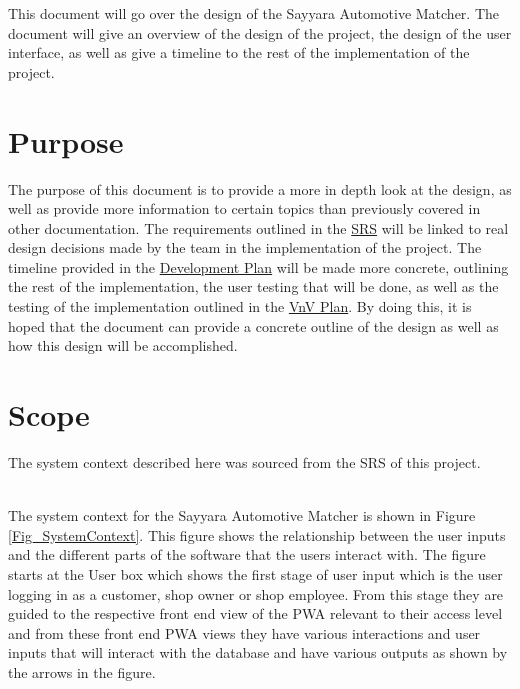 \documentclass[12pt, titlepage]{article}
\begin{document}
This document will go over the design of the Sayyara Automotive Matcher. The document will give an overview of the design of the project, the design of the user interface, as well as give a timeline to the rest of the implementation of the project.

\section{Purpose}

The purpose of this document is to provide a more in depth look at the design, as well as provide more information to certain topics than previously covered in other documentation. The requirements outlined in the \href{https://github.com/HKanwal/kapstone/blob/main/docs/SRS/SRS.pdf}{SRS}
 will be linked to real design decisions made by the team in the implementation of the project. The timeline provided in the \href{https://github.com/HKanwal/kapstone/blob/main/docs/DevelopmentPlan/DevelopmentPlan.pdf}{Development Plan} will be made more concrete, outlining the rest of the implementation, the user testing that will be done, as well as the testing of the implementation outlined in the \href{https://github.com/HKanwal/kapstone/blob/main/docs/VnVPlan/VnVPlan.pdf}{VnV Plan}. By doing this, it is hoped that the document can provide a concrete outline of the design as well as how this design will be accomplished.

\section{Scope}
The system context described here was sourced from the SRS of this project.

\noindent 
\\The system context for the Sayyara Automotive Matcher is shown in Figure \ref{Fig_SystemContext}. This figure shows the relationship between the user inputs and the different parts of the software that the users interact with. The figure starts at the User box which shows the first stage of user input which is the user logging in as a customer, shop owner or shop employee. From this stage they are guided to the respective front end view of the PWA relevant to their access level and from these front end PWA views they have various interactions and user inputs that will interact with the database and have various outputs as shown by the arrows in the figure.
\end{document}

